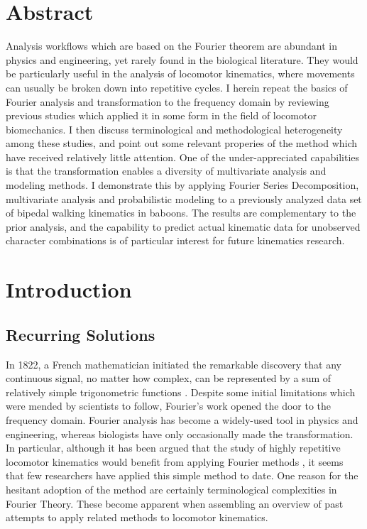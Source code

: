 \clearpage
\section{Abstract}
\label{sec:org95b28bd}
Analysis workflows which are based on the Fourier theorem are abundant in physics and engineering, yet rarely found in the biological literature.
They would be particularly useful in the analysis of locomotor kinematics, where movements can usually be broken down into repetitive cycles.
I herein repeat the basics of Fourier analysis and transformation to the frequency domain by reviewing previous studies which applied it in some form in the field of locomotor biomechanics.
I then discuss terminological and methodological heterogeneity among these studies, and point out some relevant properies of the method which have received relatively little attention.
One of the under-appreciated capabilities is that the transformation enables a diversity of multivariate analysis and modeling methods.
I demonstrate this by applying Fourier Series Decomposition, multivariate analysis and probabilistic modeling to a previously analyzed data set of bipedal walking kinematics in baboons.
The results are complementary to the prior analysis, and the capability to predict actual kinematic data for unobserved character combinations is of particular interest for future kinematics research.


\FloatBarrier\clearpage
\section{Introduction}
\label{intro12}

\subsection{Recurring Solutions}
\label{sec:orga7c10a8}
In 1822, a French mathematician initiated the remarkable discovery that any continuous signal, no matter how complex, can be represented by a sum of relatively simple trigonometric functions \citep{Fourier1822}.
Despite some initial limitations which were mended by scientists to follow, Fourier's work opened the door to the frequency domain.
Fourier analysis has become a widely-used tool in physics and engineering, whereas biologists have only occasionally made the transformation.
In particular, although it has been argued that the study of highly repetitive locomotor kinematics would benefit from applying Fourier methods \citep{Schneider1983,Pike2002,Skejo2021,Webb2007,Mielke2019}, it seems that few researchers have applied this simple method to date.
One reason for the hesitant adoption of the method are certainly terminological complexities in Fourier Theory.
These become apparent when assembling an overview of past attempts to apply related methods to locomotor kinematics.


